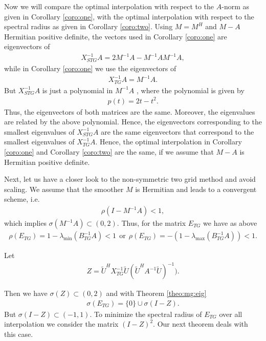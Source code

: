 \documentclass[final]{siamltex}
\newcommand{\beqo}{\begin{eqnarray*}}
\newcommand{\beq}{\begin{eqnarray}}
\newcommand{\eeqo}{\end{eqnarray*}}
\newcommand{\eeq}{\end{eqnarray}}
\numberwithin{equation}{section}
\begin{document}
Now we will compare the optimal interpolation with respect to the $A$-norm as
given in Corollary \ref{coro:one}, with  the optimal interpolation with respect
to the spectral radius as given in Corollary \ref{coro:two}. Using $M=M^H$ and
$M - A$ Hermitian positive definite, the vectors used in  Corollary
\ref{coro:one}
are  eigenvectors of
\beqo
X^{-1}_{STG}A = 2M^{-1}A - M^{-1}AM^{-1}A,
\eeqo
while in Corollary \ref{coro:one} we use  the eigenvectors of
\beqo
X^{-1}_{TG}A = M^{-1}A.
\eeqo
But $X^{-1}_{STG}A$ is just a polynomial in $M^{-1}A$ , where   the polynomial
is given by
\beq \label{eq:pol}
p(t) = 2t - t^2.
\eeq
Thus, the eigenvectors of both matrices are the same. Moreover, the
eigenvalues are  related
by   the above polynomial. Hence, the eigenvectors corresponding  to the
smallest eigenvalues of
$X^{-1}_{STG}A$  are the same   eigenvectors that correspond to the smallest
eigenvalues of $X^{-1}_{TG}A$. Hence, the optimal interpolation in Corollary
\ref{coro:one}  and Corollary
\ref{coro:two} are the same, if we assume that $M - A$ is Hermitian positive
definite.

Next, let us have  a closer look to the non-symmetric two grid method and avoid
scaling. We assume  that
the smoother $M$ is Hermitian  and  leads to a convergent scheme, i.e.
\beq  \label{eq:smoother:con:}
\rho(I - M^{-1}A) < 1, 
\eeq
which implies $\sigma(M^{-1}A) \subset (0,2).$ Thus, for the matrix $E_{TG}$
we have as above
\beqo
\rho(E_{TG}) = 1 - \lambda_{\min}(B_{TG}^{-1}A) < 1 
\ \ \mbox{or} \ \
\rho(E_{TG}) = -(1 - \lambda_{\max}(B_{TG}^{-1}A)) < 1.
\eeqo

Let 
\beqo
Z = \tilde U^HX_{TG}^{-1}\tilde U (\tilde U^HA^{-1}\tilde U)^{-1}).
\eeqo

Then we have $\sigma(Z) \subset (0,2)$ and with  Theorem \ref{theo:mg:eig}
\beqo
\sigma(E_{TG}) = \{0\} \cup \sigma(I-Z).
\eeqo
But $\sigma(I-Z) \subset (-1,1) $. To minimize the spectral radius of $E_{TG}$
over all interpolation we consider the matrix $(I - Z)^2$. Our next theorem
deals with this case.
\end{document}
